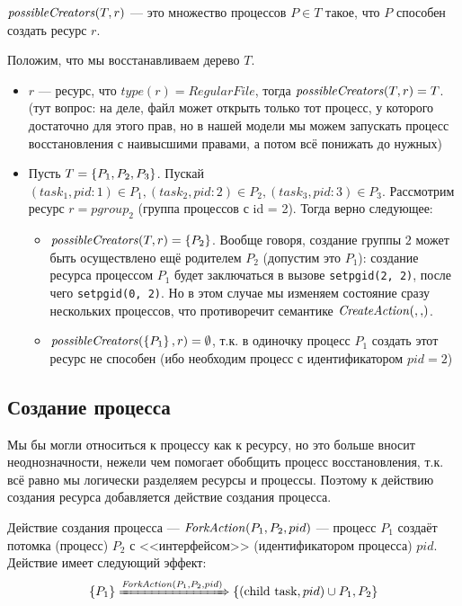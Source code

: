 \begin{defn}
\label{def:possiblecrtrs}
$\text{\textit{possibleCreators}}(T, r)$ --- это множество процессов $P \in T$ такое, что $P$ способен создать ресурс $r$.
\end{defn}

\begin{exmp}
Положим, что мы восстанавливаем дерево $T$.
\begin{itemize}
	\item $r$ --- ресурс, что $type(r) = RegularFile$, тогда $\text{\textit{possibleCreators}}(T, r) = T$. (тут вопрос: на деле, файл может открыть только тот процесс, у которого достаточно для этого прав, но в нашей модели мы можем запускать процесс восстановления с наивысшими правами, а потом всё понижать до нужных)

	\item Пусть $T = \left\lbrace P_1, P_2, P_3 \right\rbrace$. Пускай $(task_1, pid:1) \in P_1, (task_2, pid:2) \in P_2, (task_3, pid:3) \in P_3$. Рассмотрим ресурс $r = pgroup_2$ (группа процессов с id = 2). Тогда верно следующее:
	\begin{itemize}
		\item $\text{\textit{possibleCreators}}(T, r) = \left\lbrace P_2 \right\rbrace$. Вообще говоря, создание группы $2$ может быть осуществлено ещё родителем $P_2$ (допустим это $P_1$): создание ресурса процессом $P_1$ будет заключаться в вызове \texttt{setpgid(2, 2)}, после чего \texttt{setpgid(0, 2)}. Но в этом случае мы изменяем состояние сразу нескольких процессов, что противоречит семантике $\crcreate{}{}$.
		\item $\text{\textit{possibleCreators}}(\left\lbrace P_1 \right\rbrace, r) = \emptyset$, т.к. в одиночку процесс $P_1$ создать этот ресурс не способен (ибо необходим процесс с идентификатором $pid = 2$)
	\end{itemize}
\end{itemize}
\end{exmp}


\subsection{Создание процесса}

Мы бы могли относиться к процессу как к ресурсу, но это больше вносит неоднозначности, нежели чем помогает обобщить процесс восстановления, т.к. всё равно мы логически разделяем ресурсы и процессы. Поэтому к действию создания ресурса добавляется действие создания процесса.

\begin{defn}
\label{def:forkact}
Действие создания процесса --- $\text{\textit{ForkAction}}(P_1, P_2, pid)$ --- процесс $P_1$ создаёт потомка (процесс) $P_2$ с <<интерфейсом>> (идентификатором процесса) $pid$. Действие имеет следующий эффект:
\begin{equation*}
	\left\lbrace P_1 \right\rbrace \xRightarrow{\text{\textit{ForkAction}}(P_1, P_2, pid)} \left\lbrace (\text{child task}, pid) \cup P_1, P_2 \right\rbrace
\end{equation*}
\end{defn}

